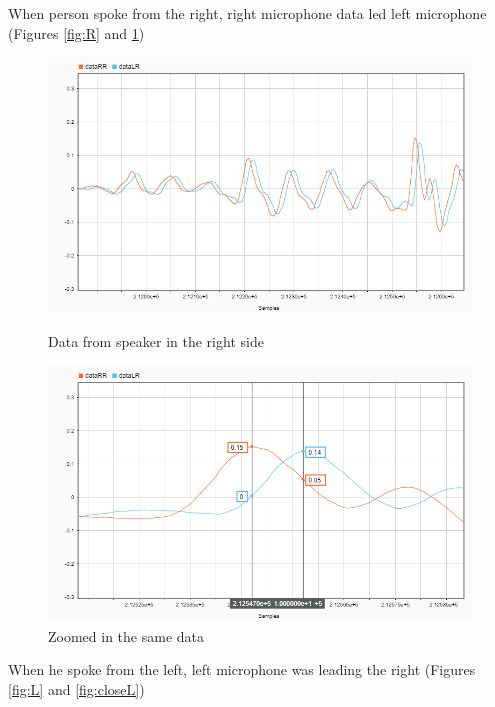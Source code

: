 When person spoke from the right, right microphone data led left microphone (Figures  
\ref{fig:R} and \ref{fig:closeR})\\
\begin{figure}[htp]
\centering
\begin{minipage}{.5\textwidth}
  \centering
  \includegraphics[width=1\linewidth]{Illustrations/DataR.png}
  \caption{Data from speaker in the right side}
  \label{fig:R}
\end{minipage}%
\begin{minipage}{.5\textwidth}
  \centering
  \includegraphics[width=1\linewidth]{Illustrations/DataR_with_Markers.png}
  \caption{Zoomed in the same data}
  \label{fig:closeR}
\end{minipage}
\end{figure}

When he spoke from the left, left microphone was leading the right (Figures  \ref{fig:L} and \ref{fig:closeL})
 
